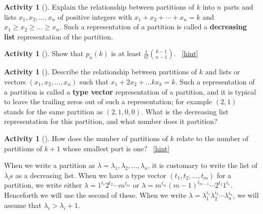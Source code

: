 \documentclass[10pt,]{book}
\newcommand{\terminology}[1]{\textbf{#1}}
\theoremstyle{plain}
\theoremstyle{definition}
\theoremstyle{definition}
\theoremstyle{definition}
\newtheorem{activity}[project]{Activity}
\numberwithin{equation}{chapter}
\begin{document}
\begin{activity}[]\label{activity-148}
\hypertarget{p-712}{}%
Explain the relationship between partitions of \(k\) into \(n\) parts and lists \(x_1,x_2,\ldots,x_n\) of positive integers with \(x_1 + x_2 + \cdots + x_n = k\) and \(x_1\ge x_2\ge\ldots \ge x_n\). Such a representation of a partition is called a \terminology{decreasing list} representation of the partition.%
\end{activity}
\begin{activity}[]\label{activity-149}
\hypertarget{p-714}{}%
Show that \(p_n(k)\) is at least \(\frac{1}{n!}\binom{k-1}{n-1}\).%
~\hfill{\tiny\hyperlink{a-149}{[hint]}\hypertarget{q-149}{}}\end{activity}
\begin{activity}[]\label{activity-150}
\hypertarget{p-717}{}%
Describe the relationship between partitions of \(k\) and lists or vectors \((x_1,x_2,\ldots,x_n)\) such that \(x_1+2x_2+\ldots kx_k = k\).  Such a representation of a partition is called a \terminology{type vector} representation of a partition, and it is typical to leave the trailing zeros out of such a representation; for example \((2,1)\) stands for the same partition as \((2,1,0,0)\). What is the decreasing list representation for this partition, and what number does it partition?%
\end{activity}
\begin{activity}[]\label{activity-151}
\hypertarget{p-719}{}%
How does the number of partitions of \(k\) relate to the number of partitions of \(k+1\) whose smallest part is one?%
~\hfill{\tiny\hyperlink{a-151}{[hint]}\hypertarget{q-151}{}}\end{activity}
\hypertarget{p-722}{}%
When we write a partition as \(\lambda = \lambda_1,\lambda_2,\ldots,\lambda_n\), it is customary to write the list of \(\lambda_i\)s as a decreasing list. When we have a type vector \((t_1,t_2,\ldots,t_m)\) for a partition, we write either \(\lambda = 1^{t_1}2^{t_2}\cdots m^{t_m}\) or \(\lambda = m^{t_m}(m-1)^{t_{m-1}}\cdots 2^{t_2}1^{t_1}\). Henceforth we will use the second of these. When we write \(\lambda=\lambda_1^{i_1}\lambda_2^{i_2}\cdots\lambda_n^{i_n}\), we will assume that \(\lambda_i>\lambda_i+1\).%
\par
\hypertarget{p-723}{}%
\end{document}
